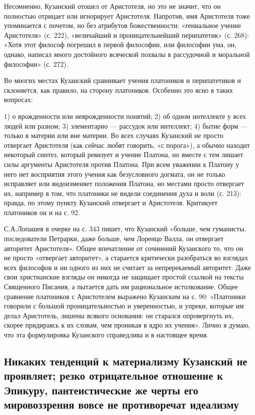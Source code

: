 Несомненно,  Кузанский  отошел  от   Аристотеля,  но  это  не  значит,
что  он  полностью  отрицает   или  игнорирует  Аристотеля.  Напротив,
имя  Аристотеля   тоже  упоминается   с  почетом,  но   без  атрибутов
божественности: «гениальное учение Аристотеля» (с. 222), «величайший и
проницательнейший перипатетик» (с. 268): «Хотя этот философ погрешил в
первой  философии,  или  философии  ума,  он,  однако,  написал  много
достойного всяческой похвалы в  рассудочной и моральной философии» (с.
272).

Во   многих   местах   Кузанский  сравнивает   учения   платоников   и
перипатетиков  и  склоняется,  как  правило,  на  сторону  платоников.
Особенно это ясно в таких вопросах:

1) о врожденности или неврожденности понятий; 2) об одном интеллекте у
всех людей или  разном; 3) элементарно --- рассудок  или интеллект; 4)
бытие  форм ---  только в  материи или  вне материи.  Во всех  случаях
Кузанский не  просто отвергает Аристотеля (как  сейчас любят говорить,
«с порога»),  а обычно  находит некоторый  синтез, который  ревизует и
учение  Платона, но  вместе  с тем  лишает  силы аргументы  Аристотеля
против  Платона. При  всем уважении  к Платону  у него  нет восприятия
этого учения  как безусловного  догмата, он  не только  исправляет или
видоизменяет  положения  Платона,  но  местами  просто  отвергает  их,
например в  том, что платоники  не видели  соединения духа и  воли (с.
213):  правда,  по  этому  пункту Кузанский  отвергает  и  Аристотеля.
Критикует платоников он и на с. 92.

С.А.Лопашев  в очерке  на с.  343  пишет, что  Кузанский «больше,  чем
гуманисты,  последователи Петрарки,  даже больше,  чем Лоренцо  Валла,
он  отвергает авторитет  Аристотеля». Общее  впечатление от  сочинений
Кузанского то,  что он  не просто  «отвергает авторитет»,  а старается
критически разобраться во  взглядах всех философов и ни  одного из них
не считает за непререкаемый  авторитет. Даже свои христианские взгляды
он никогда не защищает простой ссылкой на тексты Священного Писания, а
пытается дать им рациональное истолкование. Общее сравнение платоников
с  Аристотелем выражено  Кузанским  на с.  90:  «Платоники говорили  с
большой проницательностью  и уверенностью, и упреки,  которые им делал
Аристотель,  лишены всякого  основания: он  старался опровергнуть  их,
скорее придираясь к их словам, чем проникая в ядро их учения». Лично я
думаю,  что  эта формулировка  Кузанского  справедлива  и в  настоящее
время.

\subsection{Никаких тенденций  к материализму Кузанский  не проявляет;
резко отрицательное отношение к  Эпикуру, пантеистические же черты его
мировоззрения вовсе не противоречат идеализму}


